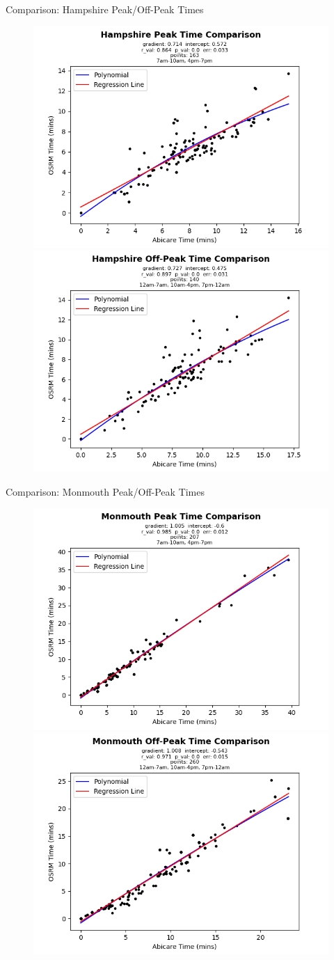 \documentclass[usenames,dvipsnames]{beamer}
\begin{document}
\begin{frame}{Comparison: Hampshire Peak/Off-Peak Times}
	\begin{figure}
		\includegraphics[width=0.5\linewidth]{figures/Hampshire_peaktime_comparison_abi}%
		\includegraphics[width=0.5\linewidth]{figures/Hampshire_offpeaktime_comparison_abi}
	\end{figure}
\end{frame}

\begin{frame}{Comparison: Monmouth Peak/Off-Peak Times}
	\begin{figure}
		\includegraphics[width=0.5\linewidth]{figures/Monmouth_peaktime_comparison_abi}%
		\includegraphics[width=0.5\linewidth]{figures/Monmouth_offpeaktime_comparison_abi}
	\end{figure}
\end{frame}
\end{document}
